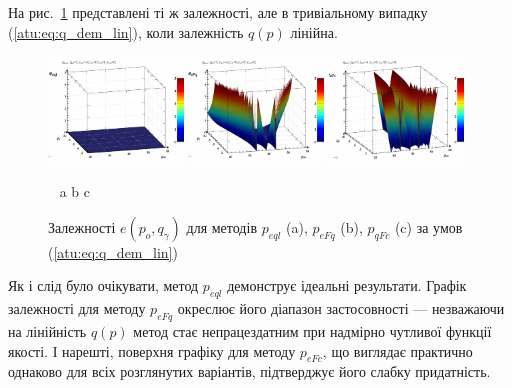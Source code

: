 На рис.~\ref{atu:f:qsl_pe_po_qg_lin} представлені ті ж залежності, але в
тривіальному випадку (\ref{atu:eq:q_dem_lin}), коли залежність
$q(p) $ лінійна.

\begin{figure}[htb!]
  \begin{center}
    \includegraphics[width=0.32\textwidth]{p/qls_pe-p_po_qg_eql_lin.png}
    \hfill
    \includegraphics[width=0.32\textwidth]{p/qls_pe-p_po_qg_eFq_lin.png}
    \hfill
    \includegraphics[width=0.32\textwidth]{p/qls_pe-p_po_qg_eFc_lin.png}
  \end{center}
  \vspace{-1.0ex}
  \begin{center}
    ~ \hfill a \hfill\hfill b \hfill\hfill c \hfill ~
  \end{center}
  \vspace{-1.5ex}
  \caption{Залежності $e(p_o,q_\gamma)$ для методів $p_{eql}$ (a), $p_{eFq}$ (b), $p_{qFc}$ (c) за умов (\ref{atu:eq:q_dem_lin})}
  \label{atu:f:qsl_pe_po_qg_lin}
\end{figure}

Як і слід було очікувати, метод
$p_{eql}$ демонструє ідеальні результати. Графік залежності для
методу
$ p_{eFq} $ окреслює його діапазон застосовності --- незважаючи на
лінійність
$q(p)$ метод стає непрацездатним при надмірно чутливої
функції якості. І нарешті, поверхня графіку для методу
$p_{eFc}$, що виглядає практично однаково для всіх розглянутих варіантів,
підтверджує його слабку придатність.


